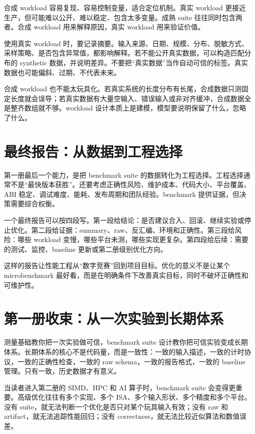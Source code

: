 合成 workload 容易复现、容易控制变量，适合定位机制。真实 workload 更接近生产，但可能难以公开、难以稳定、包含太多变量。成熟 suite 往往同时包含两者。合成 workload 用来解释原因，真实 workload 用来验证价值。

使用真实 workload 时，要记录摘要。输入来源、日期、规模、分布、脱敏方式、采样策略、是否包含异常值，都影响解释。若不能公开真实数据，可以构造匹配分布的 synthetic 数据，并说明差异。不要把“真实数据”当作自动可信的标签。真实数据也可能偏斜、过期、不代表未来。

合成 workload 也不能太玩具化。若真实系统的长度分布有长尾，合成数据只测固定长度就会误导；若真实数据有大量空输入、错误输入或非对齐缓冲，合成数据全是整齐数组就不够。workload 设计本质上是建模，模型要说明保留了什么，忽略了什么。

\section{最终报告：从数据到工程选择}

第一册最后一个能力，是把 benchmark suite 的数据转化为工程选择。工程选择通常不是“最快版本获胜”。还要考虑正确性风险、维护成本、代码大小、平台覆盖、ABI 稳定、调试难度、能耗、发布周期和团队经验。benchmark 提供证据，但决策需要综合权衡。

一个最终报告可以按四段写。第一段给结论：是否建议合入、回滚、继续实验或停止优化。第二段给证据：summary、raw、反汇编、环境和正确性。第三段给风险：哪些 workload 变慢，哪些平台未测，哪些实现更复杂。第四段给后续：需要的测试、监控、baseline 更新或第二册级别优化方向。

这样的报告让性能工程从“数字竞赛”回到项目目标。优化的意义不是让某个 microbenchmark 最好看，而是在明确条件下改善真实目标，同时不破坏正确性和可维护性。

\section{第一册收束：从一次实验到长期体系}

测量基础教你把一次实验做可信，benchmark suite 设计教你把可信实验变成长期体系。长期体系的核心不是代码量，而是一致性：一致的输入描述，一致的计时协议，一致的正确性检查，一致的 raw schema，一致的报告格式，一致的 baseline 管理。只有一致，历史数据才有意义。

当读者进入第二册的 SIMD、HPC 和 AI 算子时，benchmark suite 会变得更重要。高级优化往往有多个实现、多个 ISA、多个输入形状、多个精度和多个平台。没有 suite，就无法判断一个优化是否只对某个玩具输入有效；没有 raw 和 artifact，就无法追踪性能回归；没有 correctness，就无法比较近似算法和数值误差。

